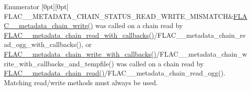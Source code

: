 \begin{DoxyEnumFields}{Enumerator}
[0pt][0pt]{}\mbox{\label{group__flac__metadata__level2_ggafe2a924893b0800b020bea8160fd4531a0d9e64ad6514c88b8ea9e9171c42ec9a}} 
F\+L\+A\+C\+\_\+\+\_\+\+M\+E\+T\+A\+D\+A\+T\+A\+\_\+\+C\+H\+A\+I\+N\+\_\+\+S\+T\+A\+T\+U\+S\+\_\+\+R\+E\+A\+D\+\_\+\+W\+R\+I\+T\+E\+\_\+\+M\+I\+S\+M\+A\+T\+CH&\mbox{\hyperlink{group__flac__metadata__level2_gaa15ead7230217de8e79f4af822cda490}{F\+L\+A\+C\+\_\+\+\_\+metadata\+\_\+chain\+\_\+write()}} was called on a chain read by \mbox{\hyperlink{group__flac__metadata__level2_ga061ae21b7836cd26f13345b897f05f3e}{F\+L\+A\+C\+\_\+\+\_\+metadata\+\_\+chain\+\_\+read\+\_\+with\+\_\+callbacks()}}/\+F\+L\+A\+C\+\_\+\+\_\+metadata\+\_\+chain\+\_\+read\+\_\+ogg\+\_\+with\+\_\+callbacks(), or \mbox{\hyperlink{group__flac__metadata__level2_ga6bf7552940ec2242718d1ab164b89e03}{F\+L\+A\+C\+\_\+\+\_\+metadata\+\_\+chain\+\_\+write\+\_\+with\+\_\+callbacks()}}/\+F\+L\+A\+C\+\_\+\+\_\+metadata\+\_\+chain\+\_\+write\+\_\+with\+\_\+callbacks\+\_\+and\+\_\+tempfile() was called on a chain read by \mbox{\hyperlink{group__flac__metadata__level2_gadb7d8e9a82aeb43e256f0a948adf5c45}{F\+L\+A\+C\+\_\+\+\_\+metadata\+\_\+chain\+\_\+read()}}/\+F\+L\+A\+C\+\_\+\+\_\+metadata\+\_\+chain\+\_\+read\+\_\+ogg(). Matching read/write methods must always be used. \\
\hline


\end{DoxyEnumFields}
